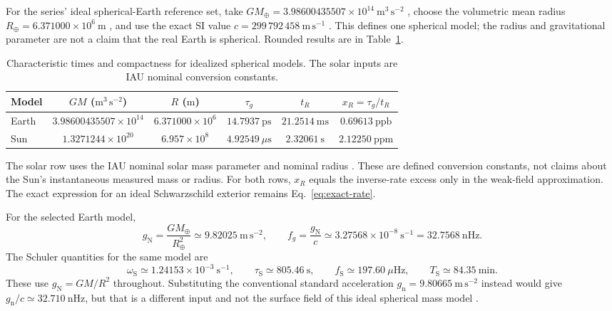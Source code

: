 \documentclass[12pt]{article}
\begin{document}
For the series' ideal spherical-Earth reference set, take $GM_{\oplus}=3.98600435507\times10^{14}\ \mathrm{m^3\,s^{-2}}$ \cite{JPL}, choose the volumetric mean radius $R_{\oplus}=6.371000\times10^6\ \mathrm{m}$ \cite{EarthFactSheet}, and use the exact SI value $c=299\,792\,458\ \mathrm{m\,s^{-1}}$ \cite{BIPM}. This defines one spherical model; the radius and gravitational parameter are not a claim that the real Earth is spherical. Rounded results are in Table~\ref{tab:body-scales}.

\begin{table}[ht]
  \centering
  \caption{Characteristic times and compactness for idealized spherical models. The solar inputs are IAU nominal conversion constants.}
  \label{tab:body-scales}
  \small
  \begin{tabular}{lccccc}
    \toprule
    Model & $GM$ ($\mathrm{m^3\,s^{-2}}$) & $R$ ($\mathrm{m}$) & $\tau_g$ & $t_R$ & $x_R=\tau_g/t_R$ \\
    \midrule
    Earth & $3.98600435507\times10^{14}$ & $6.371000\times10^6$ & $14.7937\ \mathrm{ps}$ & $21.2514\ \mathrm{ms}$ & $0.69613\ \mathrm{ppb}$ \\
    Sun & $1.3271244\times10^{20}$ & $6.957\times10^8$ & $4.92549\ \mu\mathrm{s}$ & $2.32061\ \mathrm{s}$ & $2.12250\ \mathrm{ppm}$ \\
    \bottomrule
  \end{tabular}
\end{table}

The solar row uses the IAU nominal solar mass parameter and nominal radius \cite{Prsa}. These are defined conversion constants, not claims about the Sun's instantaneous measured mass or radius. For both rows, $x_R$ equals the inverse-rate excess only in the weak-field approximation. The exact expression for an ideal Schwarzschild exterior remains Eq.~\eqref{eq:exact-rate}.

For the selected Earth model,
\begin{equation}
  g_{\mathrm{N}}=\frac{GM_{\oplus}}{R_{\oplus}^2}
  \simeq9.82025\ \mathrm{m\,s^{-2}},
  \qquad
  f_g=\frac{g_{\mathrm{N}}}{c}
  \simeq3.27568\times10^{-8}\ \mathrm{s^{-1}}
  =32.7568\ \mathrm{nHz}.
  \label{eq:earth-fg}
\end{equation}
The Schuler quantities for the same model are
\begin{equation}
  \omega_{\mathrm{S}}\simeq1.24153\times10^{-3}\ \mathrm{s^{-1}},
  \qquad
  \tau_{\mathrm{S}}\simeq805.46\ \mathrm{s},
  \qquad
  f_{\mathrm{S}}\simeq197.60\ \mu\mathrm{Hz},
  \qquad
  T_{\mathrm{S}}\simeq84.35\ \mathrm{min}.
  \label{eq:earth-schuler}
\end{equation}
These use $g_{\mathrm{N}}=GM/R^2$ throughout. Substituting the conventional standard acceleration $g_{\mathrm{n}}=9.80665\ \mathrm{m\,s^{-2}}$ instead would give $g_{\mathrm{n}}/c\simeq32.710\ \mathrm{nHz}$, but that is a different input and not the surface field of this ideal spherical mass model \cite{CGPM1901}.
\end{document}
